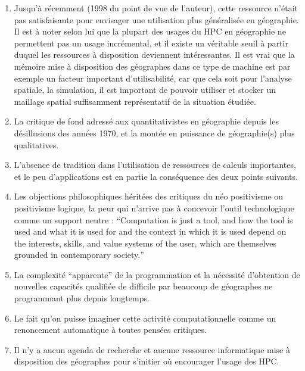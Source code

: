 \begin{enumerate}[label=(\alph*),labelindent=\parindent,leftmargin=*]
\item Jusqu’à récemment (1998 du point de vue de l’auteur), cette ressource n’était pas satisfaisante pour envisager une utilisation plus généralisée en géographie. Il est à noter selon lui que la plupart des usages du HPC en géographie ne permettent pas un usage incrémental, et il existe un véritable seuil à partir duquel les ressources à disposition deviennent intéressantes. Il est vrai que la mémoire mise à disposition des géographes dans ce type de machine est par exemple un facteur important d’utilisabilité, car que cela soit pour l’analyse spatiale, la simulation, il est important de pouvoir utiliser et stocker un maillage spatial suffisamment représentatif de la situation étudiée.
\item  La critique de fond adressé aux quantitativistes en géographie depuis les désillusions des années 1970, et la montée en puissance de géographie(s) plus qualitatives.
\item L’absence de tradition dans l’utilisation de ressources de calculs importantes, et le peu d’applications est en partie la conséquence des deux points suivants.
\item  Les objections philosophiques héritées des critiques du néo positivisme ou positivisme logique, la peur qui n’arrive pas à concevoir l’outil technologique comme un support neutre : \foreignquote{english}{Computation is just a tool, and how the tool is used and what it is used for and the context in which it is used depend on the interests, skills, and value systems of the user, which are themselves grounded in contemporary society.}
\item La complexité \enquote{apparente} de la programmation et la nécessité d’obtention de nouvelles capacités qualifiée de difficile par beaucoup de géographes ne programmant plus depuis longtemps.
\item Le fait qu’on puisse imaginer cette activité computationnelle comme un renoncement automatique à toutes pensées critiques.
\item Il n’y a aucun agenda de recherche et aucune ressource informatique mise à disposition des géographes pour s’initier où encourager l’usage des HPC.
\end{enumerate}

